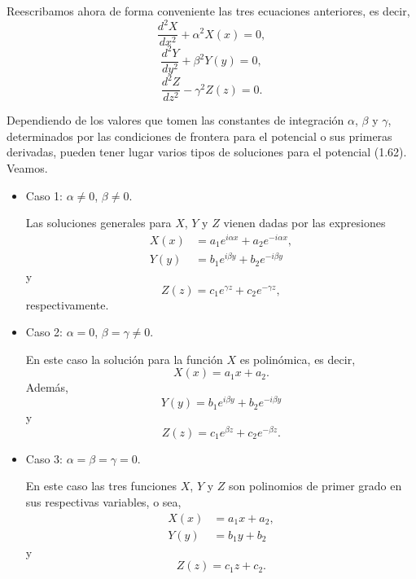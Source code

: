 \documentclass[12pt,a4paper]{book}
\begin{document}
Reescribamos ahora de forma conveniente las tres ecuaciones anteriores, es decir,
\begin{equation}
\frac{d^2X}{dx^2} + \alpha^2X(x) = 0,
\end{equation}
\begin{equation}
\frac{d^2Y}{dy^2} + \beta^2Y(y) = 0,
\end{equation}
\begin{equation}
\frac{d^2Z}{dz^2} - \gamma^2Z(z) = 0.
\end{equation}

Dependiendo de los valores que tomen las constantes de integración $\alpha$, $\beta$ y $\gamma$, determinados por las condiciones de frontera para el potencial o sus primeras derivadas, pueden tener lugar varios tipos de soluciones para el potencial (1.62). Veamos.

\begin{itemize}
\item Caso 1: $\alpha \neq 0$, $\beta \neq 0$.

Las soluciones generales para $X$, $Y$ y $Z$ vienen dadas por las expresiones
\begin{align}
X(x) &= a_1 e^{i\alpha x} + a_2 e^{-i\alpha x}, \\
Y(y) &= b_1 e^{i\beta y} + b_2 e^{-i\beta y}
\end{align}
y
\begin{equation}
Z(z) = c_1 e^{\gamma z} + c_2 e^{-\gamma z},
\end{equation}
respectivamente.

\item Caso 2: $\alpha = 0$, $\beta = \gamma \neq 0$.

En este caso la solución para la función $X$ es polinómica, es decir,
\begin{equation}
X(x) = a_1 x + a_2.
\end{equation}
Además,
\begin{equation}
Y(y) = b_1 e^{i\beta y} + b_2 e^{-i\beta y}
\end{equation}
y
\begin{equation}
Z(z) = c_1 e^{\beta z} + c_2 e^{-\beta z}.
\end{equation}

\item Caso 3: $\alpha = \beta = \gamma = 0$.

En este caso las tres funciones $X$, $Y$ y $Z$ son polinomios de primer grado en sus respectivas variables, o sea,
\begin{align}
X(x) &= a_1 x + a_2, \\
Y(y) &= b_1 y + b_2
\end{align}
y
\begin{equation}
Z(z) = c_1 z + c_2.
\end{equation}
\end{itemize}
\end{document}
